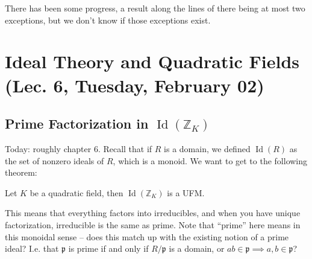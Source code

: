 \begin{remark}

There has been some progress, a result along the lines of there being at
most two exceptions, but we don't know if those exceptions exist.

\end{remark}

\hypertarget{ideal-theory-and-quadratic-fields-lec.-6-tuesday-february-02}{%
\section{Ideal Theory and Quadratic Fields (Lec. 6, Tuesday, February
02)}\label{ideal-theory-and-quadratic-fields-lec.-6-tuesday-february-02}}

\hypertarget{prime-factorization-in-operatornameidmathbbz_k}{%
\subsection{\texorpdfstring{Prime Factorization in
\(\operatorname{Id}({\mathbb{Z}}_K)\)}{Prime Factorization in \textbackslash operatorname\{Id\}(\{\textbackslash mathbb\{Z\}\}\_K)}}\label{prime-factorization-in-operatornameidmathbbz_k}}

\begin{remark}

Today: roughly chapter 6. Recall that if \(R\) is a domain, we defined
\(\operatorname{Id}(R)\) as the set of nonzero ideals of \(R\), which is
a monoid. We want to get to the following theorem:

\end{remark}

\begin{theorem}

Let \(K\) be a quadratic field, then
\(\operatorname{Id}({\mathbb{Z}}_K)\) is a UFM.

\end{theorem}

\begin{remark}

This means that everything factors into irreducibles, and when you have
unique factorization, irreducible is the same as prime. Note that
``prime'' here means in this monoidal sense -- does this match up with
the existing notion of a prime ideal? I.e. that \(\mathfrak{p}\) is
prime if and only if \(R/ \mathfrak{p}\) is a domain, or
\(ab\in \mathfrak{p}\implies a,b \in \mathfrak{p}\)?

\end{remark}

